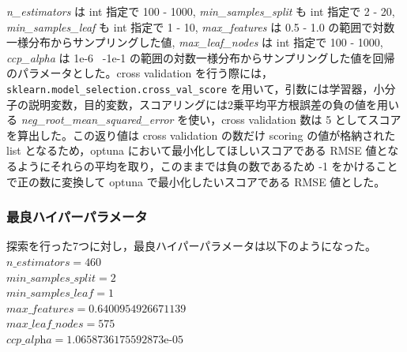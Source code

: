 \documentclass[a4j,11pt]{jarticle}
\begin{document}
 \textit{n\_estimators} は int 指定で 100 - 1000, \textit{min\_samples\_split} も int 指定で 2 - 20, \textit{min\_samples\_leaf} も int 指定で 1 - 10, \textit{max\_features} は 0.5 - 1.0 の範囲で対数一様分布からサンプリングした値, \textit{max\_leaf\_nodes} は int 指定で 100 - 1000, \textit{ccp\_alpha} は 1e-6 ~-1e-1 の範囲の対数一様分布からサンプリングした値を回帰のパラメータとした。cross validation を行う際には，\\\texttt{sklearn.model\_selection.cross\_val\_score} を用いて，引数には学習器，小分子の説明変数，目的変数，スコアリングには2乗平均平方根誤差の負の値を用いる \textit{neg\_root\_mean\_squared\_error} を使い，cross validation 数は 5 としてスコアを算出した。この返り値は cross validation の数だけ scoring の値が格納された list となるため，optuna において最小化してほしいスコアである RMSE 値となるようにそれらの平均を取り，このままでは負の数であるため -1 をかけることで正の数に変換して optuna で最小化したいスコアである RMSE 値とした。
 
\subsubsection{最良ハイパーパラメータ}
探索を行った7つに対し，最良ハイパーパラメータは以下のようになった。\\
\linebreak
$\textit{n\_estimators} = 460$\\
$\textit{min\_samples\_split} = 2$\\
$\textit{min\_samples\_leaf} = 1$\\
$\textit{max\_features} = 0.6400954926671139$\\
$\textit{max\_leaf\_nodes} = 575$\\
$\textit{ccp\_alpha} = 1.0658736175592873$e-$05$\\
\end{document}

